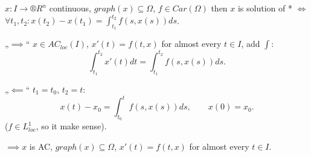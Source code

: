 \documentclass[12pt]{article}					%
\begin{document}
\begin{lemma}
	$x: I \rightarrow ®R^n$ continuous, $graph(x) \subseteq \Omega$, $f \in Car(\Omega)$ then $x$ is solution of * $\Leftrightarrow$ $\forall t_1, t_2: x(t_2) - x(t_1) = \int_{t_1}^{t_2} f(s, x(s)) ds$.

	\begin{dukazin}
		„$\implies$“ $x \in AC_{loc}(I)$, $x'(t) = f(t, x)$ for almost every $t \in I$, add $\int$:
		$$ \int_{t_1}^{t_2} x'(t) dt = \int_{t_1}^{t_2} f(s, x(s)) ds. $$

		„$\impliedby$“ $t_1 = t_0$, $t_2 = t$:
		$$ x(t) - x_0 = \int_{t_0}^t f(s, x(s)) ds, \qquad x(0) = x_0. $$
		($f \in L_{loc}^1$, so it make sense).

		$\implies x$ is AC, $graph(x) \subseteq \Omega$, $x'(t) = f(t, x)$ for almost every $t \in I$.
	\end{dukazin}
\end{lemma}
\end{document}
